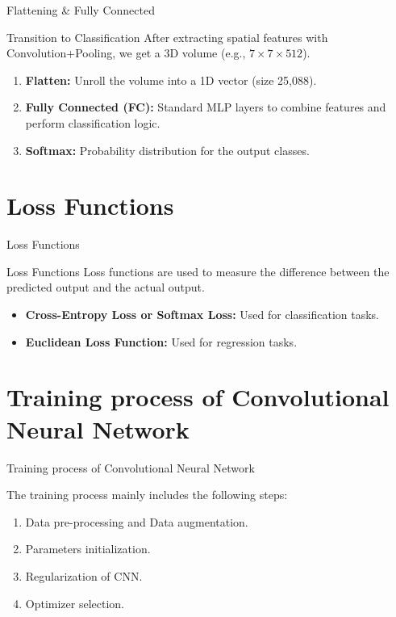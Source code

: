\documentclass[aspectratio=169,xcolor=dvipsnames]{beamer}
\begin{document}
\begin{frame}{Flattening \& Fully Connected}
    \begin{block}{Transition to Classification}
    After extracting spatial features with Convolution+Pooling, we get a 3D volume (e.g., $7 \times 7 \times 512$).
    \end{block}
    
    \begin{enumerate}
        \item \textbf{Flatten:} Unroll the volume into a 1D vector (size 25,088).
        \item \textbf{Fully Connected (FC):} Standard MLP layers to combine features and perform classification logic.
        \item \textbf{Softmax:} Probability distribution for the output classes.
    \end{enumerate}
\end{frame}

\section{Loss Functions}
\begin{frame}{Loss Functions}
\begin{block}{Loss Functions}
    Loss functions are used to measure the difference between the predicted output and the actual output.
    \begin{itemize}
        \item \textbf{Cross-Entropy Loss or Softmax Loss:} Used for classification tasks.
        \item \textbf{Euclidean Loss Function:} Used for regression tasks.
    \end{itemize}
\end{block}
\end{frame}


\section{Training process of Convolutional Neural Network}

\begin{frame}{Training process of Convolutional Neural Network}
\begin{block}{}
     The training process mainly includes the following steps:
     \begin{enumerate}
         \item Data pre-processing and Data augmentation.
         \item Parameters initialization.
         \item Regularization of CNN.
         \item Optimizer selection.
     \end{enumerate}
\end{block}
\end{frame}
\end{document}
